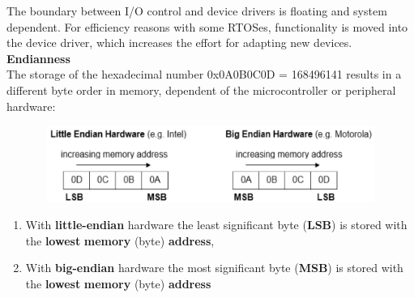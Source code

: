 The boundary between I/O control and device drivers is floating and system dependent. For efficiency reasons with some RTOSes, functionality is moved into the device driver, which increases the effort for adapting new devices.\\

{\rot\bf Endianness}\\

The storage of the hexadecimal number 0x0A0B0C0D = 168496141 results in a different byte order in memory, dependent of the microcontroller or peripheral hardware:

 	\begin{figure}[h]
    \centering
    \includegraphics[width=13cm, height=2.5cm]{Images/image120.png}
    \label{fig:Fig 69}
    \end{figure}

\begin{enumerate}
\item  With \textbf{little-endian} hardware the least significant byte (\textbf{LSB}) is stored with the \textbf{lowest} \textbf{memory} (byte) \textbf{address}, 

\item  With \textbf{big-endian} hardware the most significant byte (\textbf{MSB}) is stored with the \textbf{lowest} \textbf{memory} (byte) \textbf{address}
\end{enumerate}


